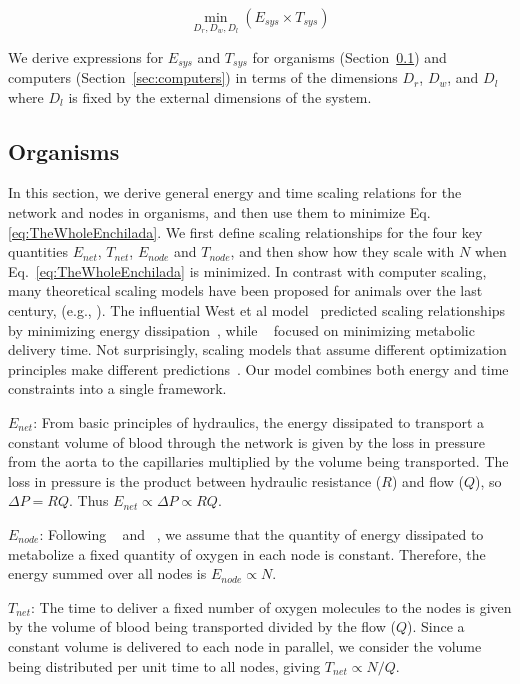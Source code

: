 \documentclass[12pt]{article}
\begin{document}
\begin{equation}
  \min_{D_r,D_w,D_l}(E_{sys} \times T_{sys})
\label{eq:TheWholeEnchilada}
\end{equation}

\noindent We derive expressions for $E_{sys}$ and $T_{sys}$ for organisms
(Section~\ref{sec:organisms}) and computers (Section~\ref{sec:computers}) in terms of
the dimensions $D_r$, $D_w$, and $D_l$ where $D_l$ is fixed by the external
dimensions of the system.


\subsection{Organisms}
\label{sec:organisms}

In this section, we derive general energy and time scaling relations for the
network and nodes in organisms, and then use them to minimize Eq.
\ref{eq:TheWholeEnchilada}.  We first define scaling relationships for the four
key quantities $E_{net}$, $T_{net}$, $E_{node}$ and $T_{node}$, and
then show
how they scale with $N$ when Eq.~\ref{eq:TheWholeEnchilada} is minimized.
In contrast with computer scaling, many theoretical scaling models have been proposed for animals over the last century, (e.g., \cite{thompson1942arcy, west97, banavar1999size, dodds2010optimal, banavar10}). The influential West et al model~\cite{west97} predicted
scaling relationships by minimizing energy dissipation~\cite{west97},
while ~\cite{banavar10} focused on minimizing metabolic delivery time. Not surprisingly, scaling models that assume different optimization principles make different predictions~\cite{newberry2015testing}.  Our model
combines both energy and time constraints into a single framework.

$E_{net}$: From basic principles of hydraulics, the energy dissipated to
transport a constant volume of blood through the network is given by the loss
in pressure from the aorta to the capillaries multiplied by the volume being
transported.  The loss in pressure is the product between hydraulic resistance ($R$) and
flow ($Q$), so $\Delta P = RQ$.  Thus $E_{net} \propto
\Delta P \propto RQ$. 

$E_{node}$: Following ~\cite{west97} and ~\cite{moses08}, we assume that the
quantity of energy dissipated to metabolize a fixed quantity of oxygen in each
node is constant.  Therefore, the energy summed over all nodes is $E_{node} \propto
N$.

$T_{net}$: The time to deliver a fixed number of oxygen molecules to the nodes
is given by the volume of blood being transported divided by the flow ($Q$).
Since a constant volume is delivered to each node in parallel, we consider the
volume being distributed per unit time to all nodes, giving $T_{net}\propto
N/Q$.  
\end{document}
